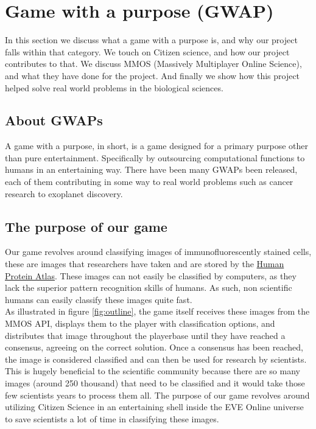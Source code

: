 \section{Game with a purpose (GWAP)}\label{sec:gwap}
In this section we discuss what a game with a purpose is, and why our project falls within that category. We touch on Citizen science, and how our project contributes to that. We discuss MMOS (Massively Multiplayer Online Science), and what they have done for the project. And finally we show how this project helped solve real world problems in the biological sciences. \\

\subsection{About GWAPs}
A game with a purpose, in short, is a game designed for a primary purpose other than pure entertainment. Specifically by outsourcing computational functions to humans in an entertaining way. There have been many GWAPs been released, each of them contributing in some way to real world problems such as cancer research to exoplanet discovery. 

\subsection{The purpose of our game}
Our game revolves around classifying images of immunofluorescently stained cells, these are images that researchers have taken and are stored by the \href{http://www.proteinatlas.org/}{Human Protein Atlas}. These images can not easily be classified by computers, as they lack the superior pattern recognition skills of humans. As such, non scientific humans can easily classify these images quite fast.\\ As illustrated in figure \ref{fig:outline}, the game itself receives these images from the MMOS API, displays them to the player with classification options, and distributes that image throughout the playerbase until they have reached a consensus, agreeing on the correct solution. Once a consensus has been reached, the image is considered classified and can then be used for research by scientists.\\ This is hugely beneficial to the scientific community because there are so many images (around 250 thousand) that need to be classified and it would take those few scientists years to process them all. The purpose of our game revolves around utilizing Citizen Science in an entertaining shell inside the EVE Online universe to save scientists a lot of time in classifying these images.

